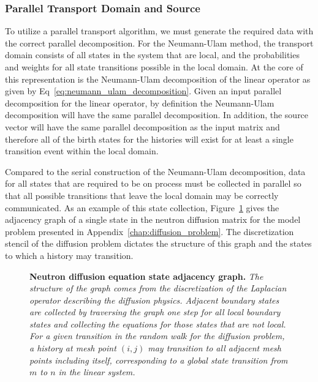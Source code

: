 \documentclass[letterpaper,11pt]{article}
\begin{document}
\subsubsection{Parallel Transport Domain and Source}
\label{subsubsec:domain_generation}
To utilize a parallel transport algorithm, we must generate the
required data with the correct parallel decomposition. For the
Neumann-Ulam method, the transport domain consists of all states in
the system that are local, and the probabilities and weights for all
state transitions possible in the local domain. At the core of this
representation is the Neumann-Ulam decomposition of the linear
operator as given by Eq~\ref{eq:neumann_ulam_decomposition}. Given an
input parallel decomposition for the linear operator, by definition
the Neumann-Ulam decomposition will have the same parallel
decomposition. In addition, the source vector will have the same
parallel decomposition as the input matrix and therefore all of the
birth states for the histories will exist for at least a single
transition event within the local domain.

Compared to the serial construction of the Neumann-Ulam decomposition,
data for all states that are required to be on process must be
collected in parallel so that all possible transitions that leave the
local domain may be correctly communicated. As an example of this
state collection, Figure~\ref{fig:diffusion_graph} gives the adjacency
graph of a single state in the neutron diffusion matrix for the model
problem presented in Appendix~\ref{chap:diffusion_problem}. The
discretization stencil of the diffusion problem dictates the structure
of this graph and the states to which a history may transition.

\begin{figure}[t!]
  \begin{center}
    \scalebox{1.5}{  }
  \end{center}
  \caption{\textbf{Neutron diffusion equation state adjacency graph.}
    \textit{The structure of the graph comes from the discretization
      of the Laplacian operator describing the diffusion
      physics. Adjacent boundary states are collected by traversing
      the graph one step for all local boundary states and collecting
      the equations for those states that are not local. For a given
      transition in the random walk for the diffusion problem, a
      history at mesh point $(i,j)$ may transition to all adjacent
      mesh points including itself, corresponding to a global state
      transition from $m$ to $n$ in the linear system.}}
  \label{fig:diffusion_graph}
\end{figure}
\end{document}
